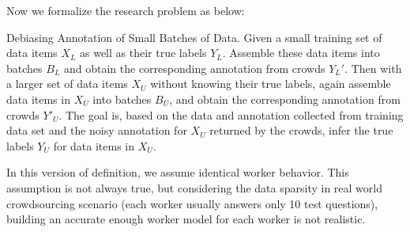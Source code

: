 Now we formalize the research problem as below:

\begin{problem} {Debiasing Annotation of Small Batches of Data.}
Given a small training set of data items $X_L$ as well as their true labels $Y_L$.
Assemble these data items into batches $B_L$ and obtain the corresponding annotation from crowds $Y_L'$.
Then with a larger set of data items $X_U$ without knowing their true labels,
again assemble data items in $X_U$ into batches $B_U$, and obtain the corresponding annotation from crowds $Y'_U$.
The goal is, based on the data and annotation collected from training data set
and the noisy annotation for $X_U$ returned by the crowds,
infer the true labels $Y_U$ for data items in $X_U$.
\end{problem}


In this version of definition, we assume identical worker behavior.
This assumption is not always true,
but considering the data sparsity in real world crowdsourcing scenario
(each worker usually answers only 10 test questions),
building an accurate enough worker model for each worker is not realistic.



